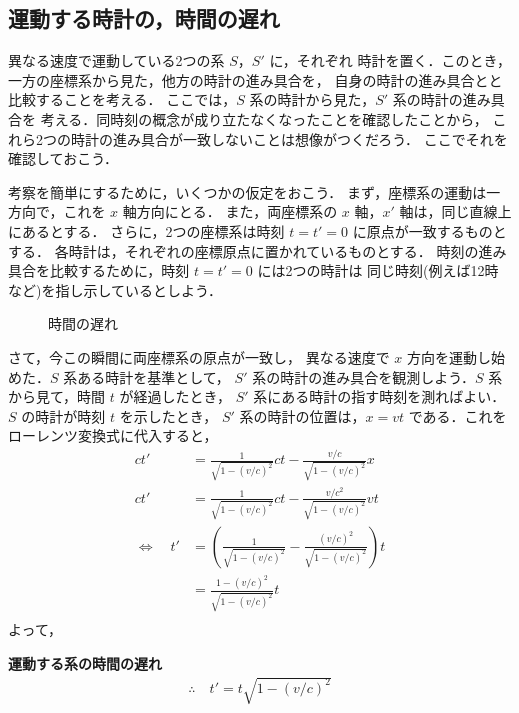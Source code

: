 \subsection{運動する時計の，時間の遅れ}
異なる速度で運動している2つの系 $S$，$S'$ に，それぞれ
時計を置く．このとき，一方の座標系から見た，他方の時計の進み具合を，
自身の時計の進み具合とと比較することを考える．
ここでは，$S$ 系の時計から見た，$S'$ 系の時計の進み具合を
考える．同時刻の概念が成り立たなくなったことを確認したことから，
これら2つの時計の進み具合が一致しないことは想像がつくだろう．
ここでそれを確認しておこう．

考察を簡単にするために，いくつかの仮定をおこう．
まず，座標系の運動は一方向で，これを $x$ 軸方向にとる．
また，両座標系の $x$ 軸，$x'$ 軸は，同じ直線上にあるとする．
さらに，2つの座標系は時刻 $t=t'=0$ に原点が一致するものとする．
各時計は，それぞれの座標原点に置かれているものとする．
時刻の進み具合を比較するために，時刻 $t=t'=0$ には2つの時計は
同じ時刻(例えば12時など)を指し示しているとしよう．

                \begin{figure}[hbt]
                    \begin{center}
                        \caption{時間の遅れ}
                        \label{fig:RT_jikan_okure}
                    \end{center}
                \end{figure}

さて，今この瞬間に両座標系の原点が一致し，
異なる速度で $x$ 方向を運動し始めた．$S$ 系ある時計を基準として，
$S'$ 系の時計の進み具合を観測しよう．$S$ 系から見て，時間 $t$ が経過したとき，
$S'$ 系にある時計の指す時刻を測ればよい．$S$ の時計が時刻 $t$ を示したとき，
$S'$ 系の時計の位置は，$x=vt$ である．これをローレンツ変換式に代入すると，
    \begin{align*}
    ct'&=\frac{1}{\sqrt{ 1-(v/c)^{2} }} ct -\frac{v/c}{\sqrt{ 1-(v/c)^{2} }} x \\
    ct'&=\frac{1}{\sqrt{ 1-(v/c)^{2} }} ct -\frac{v/{c}^{2}}{\sqrt{ 1-(v/c)^{2} }} vt \\
    \Leftrightarrow \quad
    t'&=\left(\frac{1}{\sqrt{ 1-(v/c)^{2} }} -\frac{(v/c)^{2}}{\sqrt{ 1-(v/c)^{2} }}\right) t \\
    &=\frac{1-(v/c)^{2}}{\sqrt{ 1-(v/c)^{2} }}t \\
    \end{align*}
よって，\\
    \begin{itembox}[l]{\textbf{運動する系の時間の遅れ}}
    \begin{align}
    \therefore \quad
    t'=t\sqrt{ 1-(v/c)^{2} }
    \end{align}
    \end{itembox}\\

